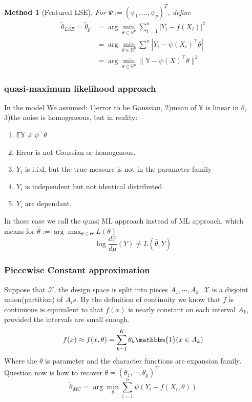 \documentclass[a4paper,12pt, oneside, fleqn]{book}
\newtheorem{method}[theorem]{Method}
\theoremstyle{definition}
\theoremstyle{remark}
\begin{document}
\begin{method}[Featured LSE]
	For $\Psi:= (\psi_1, \dots, \psi_p)^T$, define
\begin{align*}
	\tilde{\theta}_{LSE} = \tilde{\theta}_p &= \arg \min_{\theta \in \mathbb{R}^p} \sum^n_{i = 1} | Y_i - f(X_i)|^2\\
	&= \arg \min_{\theta \in \mathbb{R}^p} \sum^n |Y_i - \psi(X_i)^\top \theta |\\
	&= \arg \min_{\theta \in \mathbb{R}^p} \| \mathbb{Y} - \psi(X)^\top \theta\|^2
\end{align*}
\end{method}


\subsubsection{quasi-maximum likelihood approach}
In the model We assumed: 1)error to be Gaussian, 2)mean of $\mathbb{Y}$ is linear in $\theta$, 3)the noise is homogeneous, but in reality: 
\begin{enumerate}
	\item $\mathbb{E}\mathbb{Y} \neq \psi^\top \theta$
	\item Error is not Gaussian or homogenous.
	\item $Y_i$ is i.i.d. but the true measure is not in the parameter family
	\item $Y_i$ is independent but not identical distributed
	\item $Y_i$ are dependant. 
\end{enumerate}
In those case we call the quasi ML approach instead of ML approach, which means for $\hat{\theta}:= \arg \max_{\theta \in \Theta} L(\theta) $
\begin{equation*}
	\log \frac{d\mathbb{P}}{d\mu}(Y) \neq L(\hat{\theta}, Y) 
\end{equation*}







\subsubsection*{Piecewise Constant approximation}
Suppose that $\mathcal{X}$, the design space is split into pieces $A_1, \cdots, A_k$. $\mathcal{X}$ is a disjoint union(partition) of $A_i s$. By the definition of continuity we know that $f$ is continuous is equivalent to that $f(x)$ is nearly constant on each interval $A_k$, provided the intervals are small enough.
\begin{equation*}
	f(x) \approx f(x, \theta) = \sum_{k = 1}^{K} \theta_k \mathbbm{1}(x \in A_k)
\end{equation*}
Where the $\theta$ is parameter and the character functions are expansion family. Question now is how to recover $\theta = (\theta_1, \cdots, \theta_p)^\top$.
\begin{equation*}
	\tilde{\theta}_{MC} = \arg \min_\theta \sum_{i = 1}^n \psi(Y_i - f(X_i, \theta))
\end{equation*}
\end{document}
